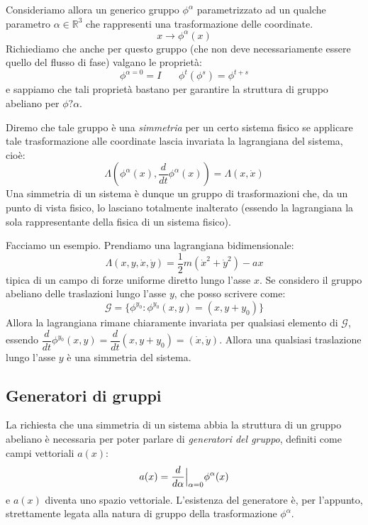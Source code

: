 \documentclass[a4paper,openany]{article}
\begin{document}
	Consideriamo allora un generico gruppo $\phi^{\alpha}$ parametrizzato ad un qualche parametro $\alpha\in\mathbb{R}^{3}$ che rappresenti una trasformazione delle coordinate.
	$$
	x \longrightarrow \phi^{\alpha}(x)
	$$ 
	Richiediamo che anche per questo gruppo (che non deve necessariamente essere quello del flusso di fase) valgano le proprietà:
	$$
	\phi^{\alpha = 0} = I \>\>\>\>\>\>\>\> \phi^{t}(\phi^{s}) = \phi^{t+s}
	$$
	e sappiamo che tali proprietà bastano per garantire la struttura di gruppo abeliano per $\phi?{\alpha}$. 
	
	Diremo che tale gruppo è una \textit{simmetria} per un certo sistema fisico se applicare tale trasformazione alle coordinate lascia invariata la lagrangiana del sistema, cioè:
	\begin{equation}
		\Lambda(\phi^{\alpha}(x),\dfrac{d}{dt}\phi^{\alpha}(x)) = \Lambda(x,\dot{x})
	\end{equation}
	Una simmetria di un sistema è dunque un gruppo di trasformazioni che, da un punto di vista fisico, lo lasciano totalmente inalterato (essendo la lagrangiana la sola rappresentante della fisica di un sistema fisico). 
	
	Facciamo un esempio. Prendiamo una lagrangiana bidimensionale:
	$$
	\Lambda(x,y,\dot{x},\dot{y}) = \dfrac{1}{2}m(\dot{x}^2+\dot{y}^2) - ax
	$$
	tipica di un campo di forze uniforme diretto lungo l'asse $x$. Se considero il gruppo abeliano delle traslazioni lungo l'asse $y$, che posso scrivere come:
	\begin{equation}
		\mathcal{G} = \{\phi^{y_0}: \phi^{y_0}(x,y) = (x,y+y_0)\}
	\end{equation}
	Allora la lagrangiana rimane chiaramente invariata per qualsiasi elemento di $\mathcal{G}$, essendo $\dfrac{d}{dt}\phi^{y_0}(x,y) = \dfrac{d}{dt}(x,y+y_0) = (\dot{x},\dot{y})$. Allora una qualsiasi traslazione lungo l'asse $y$ è una simmetria del sistema.
	\subsection{Generatori di gruppi}
	La richiesta che una simmetria di un sistema abbia la struttura di un gruppo abeliano è necessaria per poter parlare di \textit{generatori del gruppo}, definiti come campi vettoriali $a(x)$:
	\begin{equation}
		a(x) = \dfrac{d}{d\alpha}\Bigl|_{\alpha=0}\phi^{\alpha}(x)
	\end{equation}
	e $a(x)$ diventa uno spazio vettoriale. L'esistenza del generatore è, per l'appunto, strettamente legata alla natura di gruppo della trasformazione $\phi^{\alpha}$.
	
\end{document}
